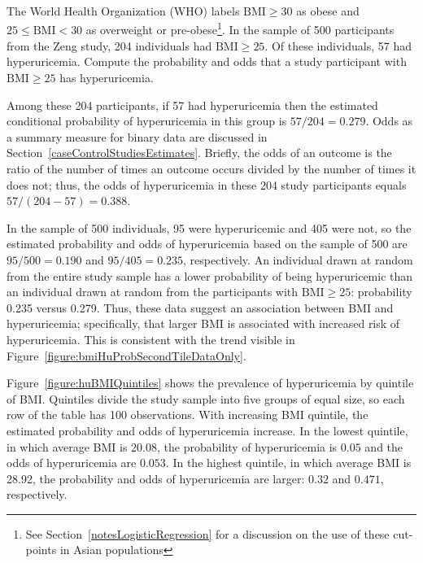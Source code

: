 \begin{examplewrap}
\begin{nexample}{The World Health Organization (WHO) labels $\text{BMI} \ge 30$ as obese and $25 \le \text{BMI} < 30$ as overweight or pre-obese\footnote{See Section~\ref{notesLogisticRegression} for a discussion on the use of these cut-points in Asian populations}. In the sample of 500 participants from the Zeng study, 204 individuals had $\text{BMI} \geq 25$. Of these individuals, 57 had hyperuricemia. Compute the probability and odds that a study participant with $\text{BMI} \ge 25$ has hyperuricemia.}\label{example:preobeseHyperurcemia}

    Among these 204 participants, if 57 had hyperuricemia then the estimated conditional probability of hyperuricemia in this group is $57/204 = 0.279$. Odds as a summary measure for binary data are discussed in Section~\ref{caseControlStudiesEstimates}. Briefly, the odds of an outcome is the ratio of the number of times an outcome occurs divided by the number of times it does not; thus, the odds of hyperuricemia in these 204 study participants equals $57/(204 - 57) = 0.388$.
\end{nexample}
\end{examplewrap}

In the sample of 500 individuals, 95 were hyperuricemic and 405 were not, so the estimated probability and odds of hyperuricemia based on the sample of 500 are $95/500 = 0.190$ and $95/405 = 0.235$, respectively.  An individual drawn at random from the entire study sample has a lower probability of being hyperuricemic than an individual drawn at random from the participants with  $\text{BMI} \geq 25$: probability 0.235 versus 0.279. Thus, these data suggest an association between BMI and hyperuricemia; specifically, that larger BMI is associated with increased risk of hyperuricemia. This is consistent with the trend visible in Figure~\ref{figure:bmiHuProbSecondTileDataOnly}.

Figure~\ref{figure:huBMIQuintiles} shows the prevalence of hyperuricemia by quintile of BMI.  Quintiles divide the study sample into five groups of equal size, so each row of the table has 100 observations. With increasing BMI quintile, the estimated probability and odds of hyperuricemia increase. In the lowest quintile, in which average BMI is 20.08, the probability of hyperuricemia is $0.05$ and the odds of hyperuricemia are $0.053$. In the highest quintile, in which average BMI is 28.92, the probability and odds of hyperuricemia are larger: $0.32$ and $0.471$, respectively.

